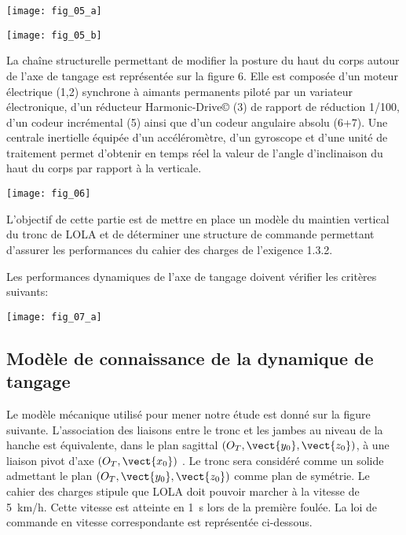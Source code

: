 \begin{multicols}{2}
\begin{center}
\texttt{[image: fig\_05\_a]}
\end{center}


\begin{center}
\texttt{[image: fig\_05\_b]}
\end{center}

La chaîne structurelle permettant de modifier la posture du haut du corps autour de l'axe de tangage est
représentée sur la figure 6. Elle est composée d’un moteur électrique (1,2) synchrone à aimants
permanents piloté par un variateur électronique, d’un réducteur
Harmonic-Drive© (3) de rapport de réduction 1/100, d’un codeur
incrémental (5) ainsi que d’un codeur angulaire absolu (6+7).
Une centrale inertielle équipée d'un accéléromètre, d'un gyroscope et
d'une unité de traitement permet d'obtenir en temps réel la valeur de
l'angle d'inclinaison du haut du corps par rapport à la verticale.


\begin{center}
\texttt{[image: fig\_06]}
\end{center}

\fi

\begin{obj}
L'objectif de cette partie est de mettre en place un modèle du maintien
vertical du tronc de LOLA et de déterminer une structure de
commande permettant d'assurer les performances du cahier des
charges de l'exigence 1.3.2.
\end{obj}

\ifprof
\else
Les performances dynamiques de l'axe de tangage doivent vérifier les critères suivants:
\begin{center}
\texttt{[image: fig\_07\_a]}
\end{center}
\fi
\subsection*{Modèle de connaissance de la dynamique de tangage}
\ifprof
\else
Le modèle mécanique utilisé pour mener notre étude est donné sur la figure suivante. L'association des liaisons entre
le tronc et les jambes au niveau de la hanche est équivalente, dans le plan sagittal $\left(O_T,\vect{y_0},\vect{z_0}\right)$, à une liaison pivot d'axe $\left(O_T,\vect{x_0}\right)$ . Le tronc sera considéré comme un solide admettant le plan $\left(O_T,\vect{y_0},\vect{z_0}\right)$ comme plan de
symétrie. Le cahier des charges stipule que LOLA doit pouvoir marcher à la vitesse de \SI{5}{km/h}. Cette vitesse
est atteinte en \SI{1}{s} lors de la première foulée. La loi de commande en vitesse correspondante est représentée
ci-dessous.


\end{multicols}

